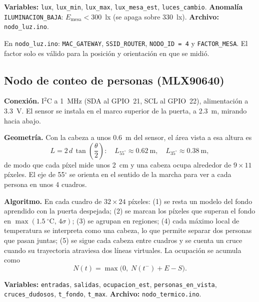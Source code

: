 \documentclass[11pt,a4paper]{article}
\newcommand{\arch}[1]{\texttt{#1}}
\begin{document}
\textbf{Variables:} \texttt{lux}, \texttt{lux\_min}, \texttt{lux\_max}, \texttt{lux\_mesa\_est},
\texttt{luces\_cambio}. \textbf{Anomal\'ia} \texttt{ILUMINACION\_BAJA}: $E_{\text{mesa}} < 300$~lx
(se apaga sobre 330~lx). \textbf{Archivo:} \arch{nodo\_luz.ino}.

\begin{completar}
En \arch{nodo\_luz.ino}: \texttt{MAC\_GATEWAY}, \texttt{SSID\_ROUTER}, \texttt{NODO\_ID = 4} y
\texttt{FACTOR\_MESA}. El factor solo es v\'alido para la posici\'on y orientaci\'on en que se midi\'o.
\end{completar}

\subsection{Nodo de conteo de personas (MLX90640)}

\textbf{Conexi\'on.} I$^2$C a 1~MHz (SDA al GPIO~21, SCL al GPIO~22), alimentaci\'on a 3.3~V.
El sensor se instala en el marco superior de la puerta, a 2.3~m, mirando hacia abajo.

\textbf{Geometr\'ia.} Con la cabeza a unos 0.6~m del sensor, el \'area vista a esa altura es
\begin{equation}
  L = 2\,d\,\tan\!\left(\frac{\theta}{2}\right):\quad
  L_{55^\circ} \approx 0.62~\text{m},\quad L_{35^\circ} \approx 0.38~\text{m},
\end{equation}
de modo que cada p\'ixel mide unos 2~cm y una cabeza ocupa alrededor de $9 \times 11$ p\'ixeles.
El eje de 55$^\circ$ se orienta en el sentido de la marcha para ver a cada persona en unos 4 cuadros.

\textbf{Algoritmo.} En cada cuadro de $32\times24$ p\'ixeles: (1) se resta un modelo del fondo
aprendido con la puerta despejada; (2) se marcan los p\'ixeles que superan el fondo en
$\max(1.5~^\circ\text{C},\,4\sigma)$; (3) se agrupan en regiones; (4) cada m\'aximo local de
temperatura se interpreta como una cabeza, lo que permite separar dos personas que pasan juntas;
(5) se sigue cada cabeza entre cuadros y se cuenta un cruce cuando su trayectoria atraviesa dos
l\'ineas virtuales. La ocupaci\'on se acumula como
\begin{equation}
  N(t) = \max\big(0,\; N(t^-) + E - S\big).
\end{equation}

\textbf{Variables:} \texttt{entradas}, \texttt{salidas}, \texttt{ocupacion\_est},
\texttt{personas\_en\_vista}, \texttt{cruces\_dudosos}, \texttt{t\_fondo}, \texttt{t\_max}.
\textbf{Archivo:} \arch{nodo\_termico.ino}.
\end{document}
